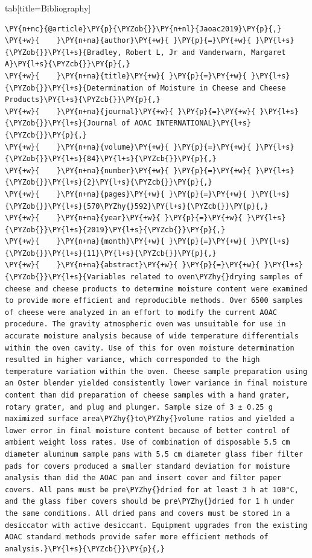 \documentclass[a4paper,twoside]{article}
\begin{document}
\begin{tsdiv}{tab}[title=Bibliography]
\begin{tscode}[lang=bibtex, engine=pygments]
\begin{Verbatim}[commandchars=\\\{\},breaklines, breakanywhere, commandchars=\\\{\}]
\PY{n+nc}{@article}\PY{p}{\PYZob{}}\PY{n+nl}{Jaoac2019}\PY{p}{,}
\PY{+w}{    }\PY{n+na}{author}\PY{+w}{ }\PY{p}{=}\PY{+w}{ }\PY{l+s}{\PYZob{}}\PY{l+s}{Bradley, Robert L, Jr and Vanderwarn, Margaret A}\PY{l+s}{\PYZcb{}}\PY{p}{,}
\PY{+w}{    }\PY{n+na}{title}\PY{+w}{ }\PY{p}{=}\PY{+w}{ }\PY{l+s}{\PYZob{}}\PY{l+s}{Determination of Moisture in Cheese and Cheese Products}\PY{l+s}{\PYZcb{}}\PY{p}{,}
\PY{+w}{    }\PY{n+na}{journal}\PY{+w}{ }\PY{p}{=}\PY{+w}{ }\PY{l+s}{\PYZob{}}\PY{l+s}{Journal of AOAC INTERNATIONAL}\PY{l+s}{\PYZcb{}}\PY{p}{,}
\PY{+w}{    }\PY{n+na}{volume}\PY{+w}{ }\PY{p}{=}\PY{+w}{ }\PY{l+s}{\PYZob{}}\PY{l+s}{84}\PY{l+s}{\PYZcb{}}\PY{p}{,}
\PY{+w}{    }\PY{n+na}{number}\PY{+w}{ }\PY{p}{=}\PY{+w}{ }\PY{l+s}{\PYZob{}}\PY{l+s}{2}\PY{l+s}{\PYZcb{}}\PY{p}{,}
\PY{+w}{    }\PY{n+na}{pages}\PY{+w}{ }\PY{p}{=}\PY{+w}{ }\PY{l+s}{\PYZob{}}\PY{l+s}{570\PYZhy{}592}\PY{l+s}{\PYZcb{}}\PY{p}{,}
\PY{+w}{    }\PY{n+na}{year}\PY{+w}{ }\PY{p}{=}\PY{+w}{ }\PY{l+s}{\PYZob{}}\PY{l+s}{2019}\PY{l+s}{\PYZcb{}}\PY{p}{,}
\PY{+w}{    }\PY{n+na}{month}\PY{+w}{ }\PY{p}{=}\PY{+w}{ }\PY{l+s}{\PYZob{}}\PY{l+s}{11}\PY{l+s}{\PYZcb{}}\PY{p}{,}
\PY{+w}{    }\PY{n+na}{abstract}\PY{+w}{ }\PY{p}{=}\PY{+w}{ }\PY{l+s}{\PYZob{}}\PY{l+s}{Variables related to oven\PYZhy{}drying samples of cheese and cheese products to determine moisture content were examined to provide more efficient and reproducible methods. Over 6500 samples of cheese were analyzed in an effort to modify the current AOAC procedure. The gravity atmospheric oven was unsuitable for use in accurate moisture analysis because of wide temperature differentials within the oven cavity. Use of this for oven moisture determination resulted in higher variance, which corresponded to the high temperature variation within the oven. Cheese sample preparation using an Oster blender yielded consistently lower variance in final moisture content than did preparation of cheese samples with a hand grater, rotary grater, and plug and plunger. Sample size of 3 ± 0.25 g maximized surface area\PYZhy{}to\PYZhy{}volume ratios and yielded a lower error in final moisture content because of better control of ambient weight loss rates. Use of combination of disposable 5.5 cm diameter aluminum sample pans with 5.5 cm diameter glass fiber filter pads for covers produced a smaller standard deviation for moisture analysis than did the AOAC pan and insert cover and filter paper covers. All pans must be pre\PYZhy{}dried for at least 3 h at 100°C, and the glass fiber covers should be pre\PYZhy{}dried for 1 h under the same conditions. All dried pans and covers must be stored in a desiccator with active desiccant. Equipment upgrades from the existing AOAC standard methods provide safer more efficient methods of analysis.}\PY{l+s}{\PYZcb{}}\PY{p}{,}

\end{Verbatim}
\end{tscode}
\end{tsdiv}
\end{document}
